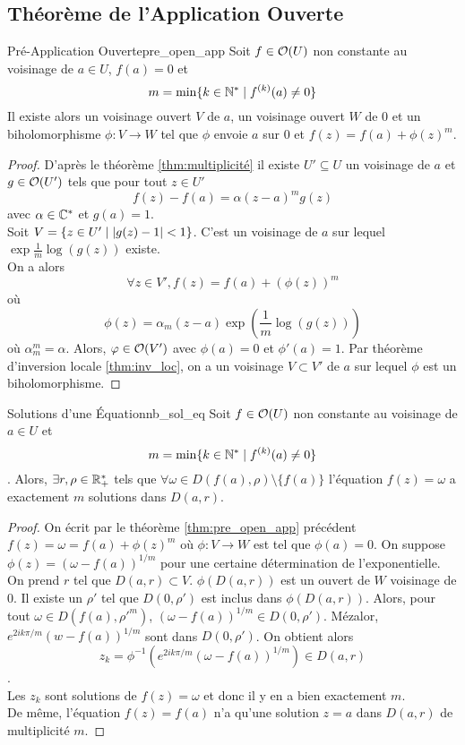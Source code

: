\documentclass{cours}
\begin{document}
\subsection{Théorème de l'Application Ouverte}
\begin{théorème}{Pré-Application Ouverte}{pre_open_app}
    Soit $f \in \mathcal{O}(U)$ non constante au voisinage de $a \in U$, $f(a) = 0$ et \[m = \min\{k \in \mathbb{N}^{*}\mid f^{(k)}(a) \neq 0\}\]
    Il existe alors un voisinage ouvert $V$ de $a$, un voisinage ouvert $W$ de $0$ et un biholomorphisme $\phi : V\to W$ tel que $\phi$ envoie $a$ sur $0$ et $f(z) = f(a) + \phi(z)^{m}$.
\end{théorème}
\begin{proof}
    D'après le théorème \ref{thm:multiplicité} il existe $U'\subseteq U$ un voisinage de $a$ et $g\in \mathcal{O}(U')$ tels que pour tout $z \in U'$
    \[
        f(z) - f(a) = \alpha(z - a)^{m}g(z)
    \]
    avec $\alpha \in \mathbb{C}^{*}$ et $g(a) = 1$.\\
    Soit $ V = \left\{z \in U'\mid \left|g(z) - 1\right| < 1\right\}$. C'est un voisinage de $a$ sur lequel $\exp \frac{1}{m}\log(g(z))$ existe.\\
    On a alors
    \[
        \forall z \in V', f(z) = f(a) + \left(\phi(z)\right)^{m}
    \]
    où 
    \[
        \phi(z) = \alpha_{m}(z - a)\exp\left(\frac{1}{m}\log(g(z))\right)
    \]
    où $\alpha_{m}^{m} = \alpha$. Alors, $\varphi \in \mathcal{O}(V')$ avec $\phi(a) = 0$ et $\phi'(a) = 1$. Par théorème d'inversion locale \ref{thm:inv_loc}, on a un voisinage $V \subset V'$ de $a$ sur lequel $\phi$ est un biholomorphisme.
\end{proof}

\begin{corollaire}{Solutions d'une Équation}{nb_sol_eq}
    Soit $f\in \mathcal{O}(U)$ non constante au voisinage de $a \in U$ et \[m = \min\{k \in \mathbb{N}^{*}\mid f^{(k)}(a) \neq 0\}\]. Alors, $\exists r,\rho \in \mathbb{R}_{+}^{*}$ tels que $\forall \omega \in D(f(a), \rho) \setminus \{f(a)\}$ l'équation $f(z) = \omega$ a exactement $m$ solutions dans $D(a, r)$.
\end{corollaire}
\begin{proof}
    On écrit par le théorème \ref{thm:pre_open_app} précédent $f(z) = \omega = f(a) + \phi(z)^{m}$ où $\phi : V \to W$ est tel que $\phi(a) = 0$. On suppose $\phi(z) = \left(\omega - f(a)\right)^{1/m}$ pour une certaine détermination de l'exponentielle. 
    On prend $r$ tel que $D(a, r) \subset V$. $\phi(D(a, r))$ est un ouvert de $W$ voisinage de $0$. Il existe un $\rho'$ tel que $D(0, \rho')$ est inclus dans $\phi(D(a, r))$. 
    Alors, pour tout $\omega \in D(f(a), \rho'^{m})$, $\left(\omega - f(a)\right)^{1/m} \in D(0, \rho')$. Mézalor, $e^{2ik\pi/m}\left(w -f(a)\right)^{1/m}$ sont dans $D(0, \rho')$.
    On obtient alors \[z_{k} = \phi^{-1}\left(e^{2ik\pi/m}\left(\omega - f(a)\right)^{1/m}\right) \in D(a, r)\].\\
    Les $z_{k}$ sont solutions de $f(z) = \omega$ et donc il y en a bien exactement $m$. \\
    De même, l'équation $f(z) = f(a)$ n'a qu'une solution $z = a$ dans $D(a, r)$ de multiplicité $m$.
\end{proof}
\end{document}
